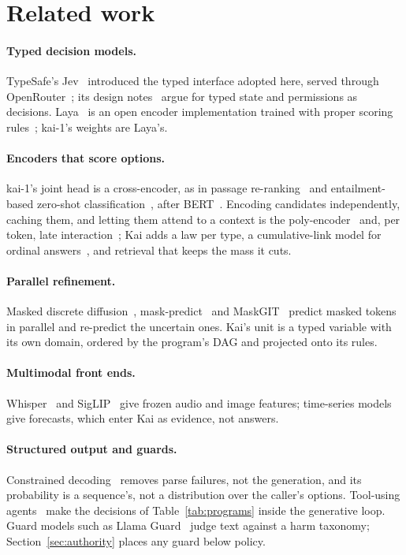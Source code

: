 \section{Related work}
\label{sec:related}

\paragraph{Typed decision models.}
TypeSafe's Jev~\cite{typesafejev} introduced the typed interface adopted
here, served through OpenRouter~\cite{openrouterdecisions}; its design
notes~\cite{jevnote} argue for typed state and permissions as decisions.
Laya~\cite{laya} is an open encoder implementation trained with proper scoring
rules~\cite{gneiting2007}; kai-1's weights are Laya's.

\paragraph{Encoders that score options.}
kai-1's joint head is a cross-encoder, as in passage
re-ranking~\cite{nogueira2019} and entailment-based zero-shot
classification~\cite{yin2019}, after BERT~\cite{devlin2019}. Encoding
candidates independently, caching them, and letting them attend to a context is
the poly-encoder~\cite{humeau2020poly} and, per token, late
interaction~\cite{khattab2020colbert}; Kai adds a law per type, a
cumulative-link model for ordinal answers~\cite{mccullagh1980}, and retrieval
that keeps the mass it cuts.

\paragraph{Parallel refinement.}
Masked discrete diffusion~\cite{austin2021d3pm},
mask-predict~\cite{ghazvininejad2019} and MaskGIT~\cite{chang2022maskgit}
predict masked tokens in parallel and re-predict the uncertain ones. Kai's unit
is a typed variable with its own domain, ordered by the program's DAG and
projected onto its rules.

\paragraph{Multimodal front ends.}
Whisper~\cite{radford2023whisper} and SigLIP~\cite{zhai2023siglip} give
frozen audio and image features; time-series
models~\cite{das2024timesfm,ansari2024chronos} give forecasts, which enter Kai
as evidence, not answers.

\paragraph{Structured output and guards.}
Constrained decoding~\cite{willard2023} removes parse failures, not the
generation, and its probability is a sequence's, not a distribution over the
caller's options. Tool-using agents~\cite{yao2023react,schick2023toolformer}
make the decisions of Table~\ref{tab:programs} inside the generative loop.
Guard models such as Llama Guard~\cite{inan2023llamaguard} judge text against
a harm taxonomy; Section~\ref{sec:authority} places any guard below policy.

